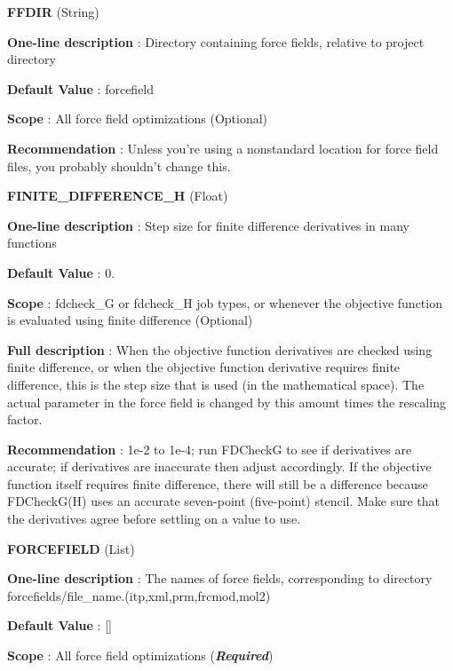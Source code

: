 \begin{DoxyItemize}
\item {\bfseries  \-F\-F\-D\-I\-R } (\-String) \par
{\bfseries  \-One-\/line description }\-: \-Directory containing force fields, relative to project directory \par
{\bfseries  \-Default \-Value }\-: forcefield \par
{\bfseries  \-Scope }\-: \-All force field optimizations (\-Optional) \par
{\bfseries  \-Recommendation }\-: \-Unless you're using a nonstandard location for force field files, you probably shouldn't change this.\end{DoxyItemize}
\begin{DoxyItemize}
\item {\bfseries  \-F\-I\-N\-I\-T\-E\-\_\-\-D\-I\-F\-F\-E\-R\-E\-N\-C\-E\-\_\-\-H } (\-Float) \par
{\bfseries  \-One-\/line description }\-: \-Step size for finite difference derivatives in many functions \par
{\bfseries  \-Default \-Value }\-: 0. \par
{\bfseries  \-Scope }\-: fdcheck\-\_\-\-G or fdcheck\-\_\-\-H job types, or whenever the objective function is evaluated using finite difference (\-Optional) \par
{\bfseries  \-Full description }\-: \-When the objective function derivatives are checked using finite difference, or when the objective function derivative requires finite difference, this is the step size that is used (in the mathematical space). \-The actual parameter in the force field is changed by this amount times the rescaling factor. \par
{\bfseries  \-Recommendation }\-: 1e-\/2 to 1e-\/4; run \-F\-D\-Check\-G to see if derivatives are accurate; if derivatives are inaccurate then adjust accordingly. \-If the objective function itself requires finite difference, there will still be a difference because \-F\-D\-Check\-G(\-H) uses an accurate seven-\/point (five-\/point) stencil. \-Make sure that the derivatives agree before settling on a value to use.\end{DoxyItemize}
\begin{DoxyItemize}
\item {\bfseries  \-F\-O\-R\-C\-E\-F\-I\-E\-L\-D } (\-List) \par
{\bfseries  \-One-\/line description }\-: \-The names of force fields, corresponding to directory forcefields/file\-\_\-name.(itp,xml,prm,frcmod,mol2) \par
{\bfseries  \-Default \-Value }\-: \mbox{[}\mbox{]} \par
{\bfseries  \-Scope }\-: \-All force field optimizations ({\bfseries {\itshape \-Required\/}})\end{DoxyItemize}
